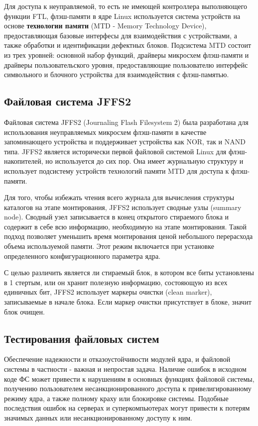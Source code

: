 Для доступа к неуправляемой, то есть не имеющей контроллера выполняющего функции FTL, флэш-памяти в ядре Linux используется система устройств на основе \textbf{технологии памяти} (MTD - Memory Technology Device), предоставляющая базовые интерфесы для взаимодействия с устройствами, а также обработки и идентификации дефектных блоков. Подсистема MTD состоит из трех уровней: основной набор функций, драйверы микросхем флэш-памяти и драйверы пользовательского уровня, предоставляющие пользователю интерфейс символьного и блочного устройства для взаимодействия с флэш-памятью.

\subsection{Файловая система JFFS2}

Файловая система JFFS2 (Journaling Flash Filesystem 2) была разработана для использования неуправляемых микросхем флэш-памяти в качестве запоминающего устройства и поддерживает устройства как NOR, так и NAND типа. JFFS2 является исторически первой файловой системой Linux для флэш-накопителей, но используется до сих пор. Она имеет журнальную структуру и использует подсистему устройств технологий памяти MTD для доступа к флэш-памяти.

Для того, чтобы избежать чтения всего журнала для вычисления структуры каталогов на этапе монтирования, JFFS2 использует сводные узлы (summary node). Сводный узел записывается в конец открытого стираемого блока и содержит в себе всю информацию, необходимую на этапе монтирования. Такой подход позволяет уменьшить время монтирования ценой небольшого перерасхода объема используемой памяти. Этот режим включается при установке определенного конфигурационного параметра ядра.

С целью различить является ли стираемый блок, в котором все биты установлены в 1 стертым, или он хранит полезную информацию, состояющую из всех единичных бит, JFFS2 использует маркеры очистки (clean marker), записываемые в начале блока. Если маркер очистки присутствует в блоке, значит блок очищен.

\subsection{Тестирования файловых систем}

Обеспечение надежности и отказоустойчивости модулей ядра, и файловой системы в частности - важная и непростая задача. Наличие ошибок в исходном коде ФС может привести к нарушениям в основных функциях файловой системы, получению пользователем несанкционированного доступа к привелигированному режиму ядра, а также полному краху или блокировке системы. Подобные последствия ошибок на серверах и суперкомпьютерах могут привести к потерям значимых данных или несанкционированному доступу к ним.

